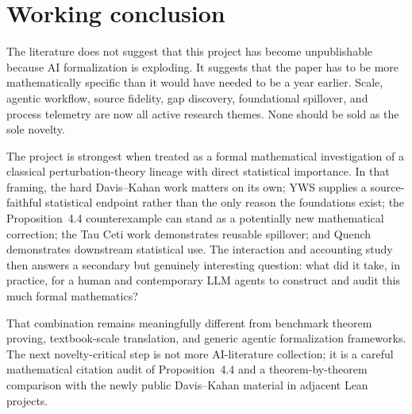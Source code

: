 \documentclass[11pt]{article}
\newcommand{\TauCeti}{Tau Ceti}
\begin{document}
\section{Working conclusion}
\label{sec:conclusion}

The literature does not suggest that this project has become unpublishable
because AI formalization is exploding.  It suggests that the paper has to be
more mathematically specific than it would have needed to be a year earlier.
Scale, agentic workflow, source fidelity, gap discovery, foundational spillover,
and process telemetry are now all active research themes.  None should be sold
as the sole novelty.

The project is strongest when treated as a formal mathematical investigation of
a classical perturbation-theory lineage with direct statistical importance.  In
that framing, the hard Davis--Kahan work matters on its own; YWS supplies a
source-faithful statistical endpoint rather than the only reason the
foundations exist; the Proposition~4.4 counterexample can stand as a potentially
new mathematical correction; the \TauCeti{} work demonstrates reusable
spillover; and Quench demonstrates downstream statistical use.  The interaction
and accounting study then answers a secondary but genuinely interesting
question: what did it take, in practice, for a human and contemporary LLM agents
to construct and audit this much formal mathematics?

That combination remains meaningfully different from benchmark theorem proving,
textbook-scale translation, and generic agentic formalization frameworks.  The
next novelty-critical step is not more AI-literature collection; it is a careful
mathematical citation audit of Proposition~4.4 and a theorem-by-theorem
comparison with the newly public Davis--Kahan material in adjacent Lean
projects.

\clearpage


\end{document}
